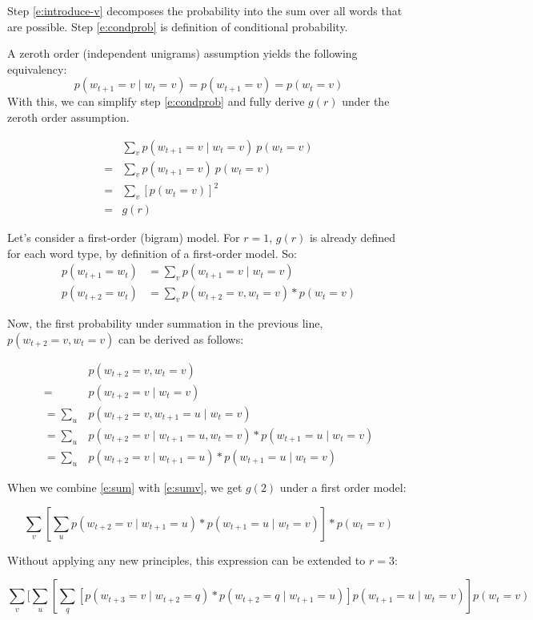 \documentclass[11pt,letterpaper]{article}
\theoremstyle{definition}
\begin{document}
Step \ref{e:introduce-v} decomposes the probability into the sum over all words that are possible.  Step \ref{e:condprob} is definition of conditional probability.


A zeroth order (independent unigrams) assumption yields the following equivalency:
\[p(w_{t+1}=v \mid w_t=v) = p(w_{t+1}=v) = p(w_{t}=v)\]
With this, we can simplify step \ref{e:condprob} and fully derive $g(r)$ under the zeroth order assumption.

\begin{align}
&\sum_v p(w_{t+1}=v \mid w_t=v)\ p(w_t=v) \\
= &\sum_v p(w_{t+1}=v)\ p(w_t=v)\\
= &\sum_v [p(w_{t}=v)]^2  \\
= &g(r) 
\end{align}

Let's consider a first-order (bigram) model. For $r=1$, $g(r)$ is already defined for each word type, by definition of a first-order model. So:
\begin{align}
p(w_{t+1} = w_{t}) &=  \sum_v p(w_{t+1} = v \mid w_{t} = v)\\
p(w_{t+2} = w_{t}) &=  \sum_v p(w_{t+2} = v , w_{t} = v) * p(w_{t} = v) \label{e:sumv}
\end{align}

 Now, the first probability under summation in the previous line, $p(w_{t+2} = v , w_{t} = v)$ can be derived as follows:

\begin{align}
  &p(w_{t+2} = v , w_{t} = v)\\
= &p(w_{t+2} = v  \mid w_{t} = v)\\
= \sum_u &p(w_{t+2} = v , w_{t+1} = u \mid w_{t} = v)\\
= \sum_u &p(w_{t+2} = v \mid w_{t+1} = u , w_{t} = v) * p(w_{t+1} = u \mid w_{t} = v)\\
= \sum_u &p(w_{t+2} = v \mid w_{t+1} = u ) * p(w_{t+1} = u \mid w_{t} = v) \label{e:sumu}
\end{align}

When we combine \ref{e:sum} with \ref{e:sumv}, we get $g(2)$ under a first order model:


\[ \sum_v [\sum_u p(w_{t+2} = v \mid w_{t+1} = u ) * p(w_{t+1} = u \mid w_{t} = v)] * p(w_{t} = v) \]

Without applying any new principles, this expression can be extended to $r = 3$:


\[ \sum_v [\sum_u [\sum_q [p(w_{t+3} = v \mid w_{t+2} = q ) * p(w_{t+2} = q \mid w_{t+1} = u)] p(w_{t+1} = u \mid w_{t} = v) ] p(w_{t} = v) \]
\end{document}
